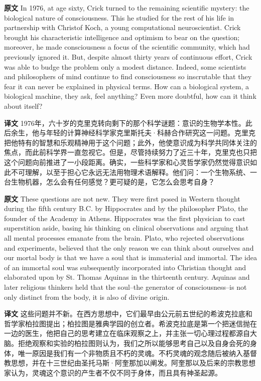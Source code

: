 \documentclass[UTF8,zihao=-4]{ctexart}
\newcommand{\BodyFont}{\fontsize{10.5pt}{15.5pt}\selectfont}
\newcommand{\origlabel}{\textbf{原文}\quad}
\newcommand{\translabel}{\textbf{译文}\quad}
\newenvironment{enblock}{\par\noindent\begingroup\BodyFont\origlabel}{\par\endgroup}
\newenvironment{zhblock}{\par\noindent\begingroup\BodyFont\translabel}{\par\endgroup\vspace{0.35em}}
\begin{document}
\begin{enblock}
In 1976, at age sixty, Crick turned to the remaining scientific mystery: the biological nature of consciousness. This he studied for the rest of his life in partnership with Christof Koch, a young computational neuroscientist. Crick brought his characteristic intelligence and optimism to bear on the question; moreover, he made consciousness a focus of the scientific community, which had previously ignored it. But, despite almost thirty years of continuous effort, Crick was able to budge the problem only a modest distance. Indeed, some scientists and philosophers of mind continue to find consciousness so inscrutable that they fear it can never be explained in physical terms. How can a biological system, a biological machine, they ask, feel anything? Even more doubtful, how can it think about itself?
\end{enblock}
\begin{zhblock}
1976年，六十岁的克里克转向剩下的那个科学谜题：意识的生物学本性。此后余生，他与年轻的计算神经科学家克里斯托夫·科赫合作研究这一问题。克里克把他特有的智慧和乐观精神用于这个问题；此外，他使意识成为科学共同体关注的焦点，而此前科学界一直忽视它。但是，尽管持续努力了近三十年，克里克也只把这个问题向前推进了一小段距离。确实，一些科学家和心灵哲学家仍然觉得意识如此不可理解，以至于担心它永远无法用物理术语解释。他们问：一个生物系统、一台生物机器，怎么会有任何感觉？更可疑的是，它怎么会思考自身？
\end{zhblock}

\begin{enblock}
These questions are not new. They were first posed in Western thought during the fifth century B.C. by Hippocrates and by the philosopher Plato, the founder of the Academy in Athens. Hippocrates was the first physician to cast superstition aside, basing his thinking on clinical observations and arguing that all mental processes emanate from the brain. Plato, who rejected observations and experiments, believed that the only reason we can think about ourselves and our mortal body is that we have a soul that is immaterial and immortal. The idea of an immortal soul was subsequently incorporated into Christian thought and elaborated upon by St. Thomas Aquinas in the thirteenth century. Aquinas and later religious thinkers held that the soul--the generator of consciousness--is not only distinct from the body, it is also of divine origin.
\end{enblock}
\begin{zhblock}
这些问题并不新。在西方思想中，它们最早由公元前五世纪的希波克拉底和哲学家柏拉图提出；柏拉图是雅典学园的创立者。希波克拉底是第一个把迷信抛在一边的医生，他把自己的思考建立在临床观察之上，并主张一切心理过程都源自大脑。拒绝观察和实验的柏拉图则认为，我们之所以能够思考自己以及自身会死的身体，唯一原因是我们有一个非物质且不朽的灵魂。不朽灵魂的观念随后被纳入基督教思想，并在十三世纪由圣托马斯·阿奎那加以阐发。阿奎那以及后来的宗教思想家认为，灵魂这个意识的产生者不仅不同于身体，而且具有神圣起源。\end{zhblock}
\end{document}

